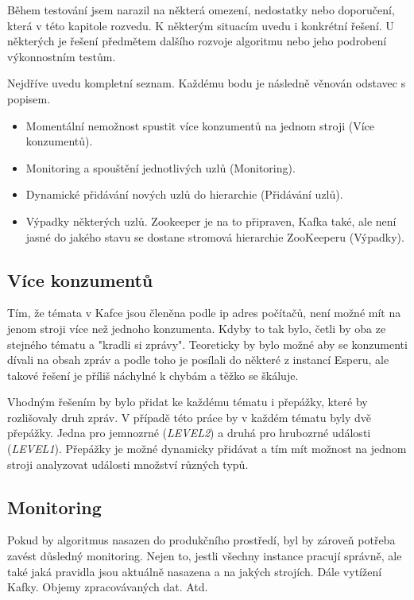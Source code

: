 \documentclass[
  digital, %
  table,   %
  nolof,     %
  nolot,     %
  oneside, %
  nocover,
  monochrome,
  12pt
]{fithesis3}
\begin{document}
Během testování jsem narazil na některá omezení, nedostatky nebo doporučení, která v této kapitole rozvedu. K některým situacím uvedu i konkrétní řešení. U některých je řešení předmětem dalšího rozvoje algoritmu nebo jeho podrobení výkonnostním testům.

Nejdříve uvedu kompletní seznam. Každému bodu je následně věnován odstavec s popisem.

\begin{itemize}
	\item Momentální nemožnost spustit více konzumentů na jednom stroji (Více konzumentů).
	\item Monitoring a spouštění jednotlivých uzlů (Monitoring).
	\item Dynamické přidávání nových uzlů do hierarchie (Přidávání uzlů).
	\item Výpadky některých uzlů. Zookeeper je na to připraven, Kafka také, ale není jasné do jakého stavu se dostane stromová hierarchie ZooKeeperu (Výpadky).
\end{itemize}

\subsection*{Více konzumentů}
Tím, že témata v Kafce jsou členěna podle ip adres počítačů, není možné mít na jenom stroji více než jednoho konzumenta. Kdyby to tak bylo, četli by oba ze stejného tématu a "kradli si zprávy". Teoreticky by bylo možné aby se konzumenti dívali na obsah zpráv a podle toho je posílali do některé z instancí Esperu, ale takové řešení je příliš náchylné k chybám a těžko se škáluje.

Vhodným řešením by bylo přidat ke každému tématu i přepážky, které by rozlišovaly druh zpráv. V případě této práce by v každém tématu byly dvě přepážky. Jedna pro jemnozrné (\textit{LEVEL2}) a druhá pro hrubozrné události (\textit{LEVEL1}). Přepážky je možné dynamicky přidávat a tím mít možnost na jednom stroji analyzovat události množství různých typů.

\subsection*{Monitoring}
Pokud by algoritmus nasazen do produkčního prostředí, byl by zároveň potřeba zavést  důsledný monitoring. Nejen to, jestli všechny instance pracují správně, ale také jaká pravidla jsou aktuálně nasazena a na jakých strojích. Dále vytížení Kafky. Objemy zpracovávaných dat. Atd.
\end{document}
